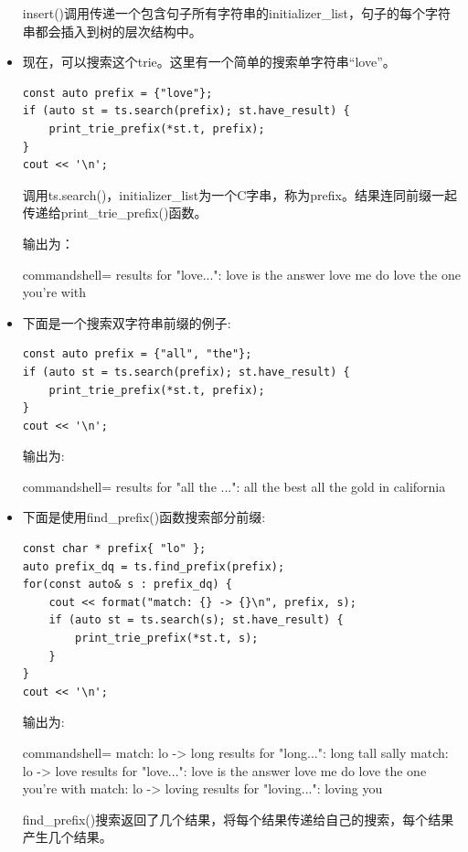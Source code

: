 \begin{itemize}
insert()调用传递一个包含句子所有字符串的initializer\_list，句子的每个字符串都会插入到树的层次结构中。

\item 
现在，可以搜索这个trie。这里有一个简单的搜索单字符串“love”。

\begin{lstlisting}[style=styleCXX]
const auto prefix = {"love"};
if (auto st = ts.search(prefix); st.have_result) {
	print_trie_prefix(*st.t, prefix);
}
cout << '\n';
\end{lstlisting}

调用ts.search()，initializer\_list为一个C字串，称为prefix。结果连同前缀一起传递给print\_trie\_prefix()函数。

输出为：

\begin{tcblisting}{commandshell={}}
results for "love...":
love is the answer
love me do
love the one you're with
\end{tcblisting}

\item
下面是一个搜索双字符串前缀的例子:

\begin{lstlisting}[style=styleCXX]
const auto prefix = {"all", "the"};
if (auto st = ts.search(prefix); st.have_result) {
	print_trie_prefix(*st.t, prefix);
}
cout << '\n';
\end{lstlisting}

输出为:

\begin{tcblisting}{commandshell={}}
results for "all the ...":
all the best
all the gold in california
\end{tcblisting}

\item
下面是使用find\_prefix()函数搜索部分前缀:

\begin{lstlisting}[style=styleCXX]
const char * prefix{ "lo" };
auto prefix_dq = ts.find_prefix(prefix);
for(const auto& s : prefix_dq) {
	cout << format("match: {} -> {}\n", prefix, s);
	if (auto st = ts.search(s); st.have_result) {
		print_trie_prefix(*st.t, s);
	}
}
cout << '\n';
\end{lstlisting}

输出为:

\begin{tcblisting}{commandshell={}}
match: lo -> long
results for "long...":
long tall sally
match: lo -> love
results for "love...":
love is the answer
love me do
love the one you're with
match: lo -> loving
results for "loving...":
loving you
\end{tcblisting}

find\_prefix()搜索返回了几个结果，将每个结果传递给自己的搜索，每个结果产生几个结果。

\end{itemize}


